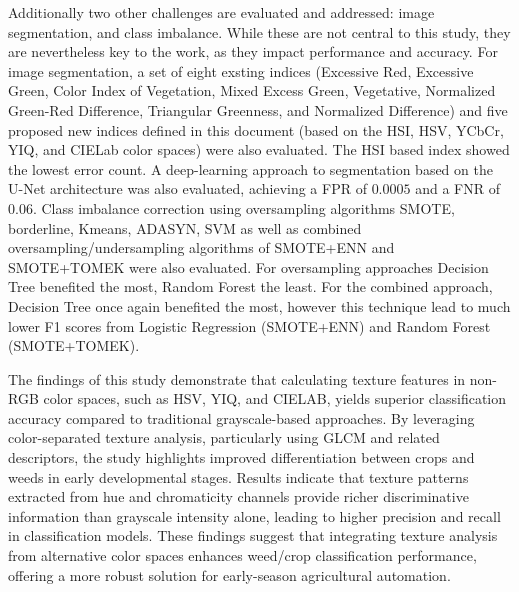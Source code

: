 \documentclass[letterpaper]{report}
\begin{document}
Additionally two other challenges are evaluated and addressed: image segmentation, and class imbalance. While these are not central to  this study, they are nevertheless key to the work, as they impact performance and accuracy.  For image segmentation, a set of eight exsting indices (Excessive Red, Excessive Green, Color Index of Vegetation, Mixed Excess Green, Vegetative, Normalized Green-Red Difference, Triangular Greenness, and Normalized Difference) and five proposed new indices defined in this document (based on the HSI, HSV, YCbCr, YIQ, and CIELab color spaces) were also evaluated. The HSI based index showed the lowest error count. A deep-learning approach to segmentation based on the U-Net architecture was also evaluated, achieving a \gls{FPR} of $0.0005$ and a \gls{FNR} of $0.06$. 
Class imbalance correction using oversampling algorithms \gls{SMOTE}, borderline, Kmeans, \gls{ADASYN}, \gls{SVM} as well as combined oversampling/undersampling algorithms of SMOTE+\gls{ENN} and SMOTE+TOMEK were also evaluated. For oversampling approaches Decision Tree benefited the most, Random Forest the least. For the combined approach, Decision Tree once again benefited the most, however this technique lead to much lower F1 scores from Logistic Regression (SMOTE+ENN) and Random Forest (SMOTE+TOMEK).

The findings of this study demonstrate that calculating texture features in non-RGB color spaces, such as \gls{HSV}, YIQ, and CIELAB, yields superior classification accuracy compared to traditional grayscale-based approaches. By leveraging color-separated texture analysis, particularly using \gls{GLCM} and related descriptors, the study highlights improved differentiation between crops and weeds in early developmental stages. Results indicate that texture patterns extracted from hue and chromaticity channels provide richer discriminative information than grayscale intensity alone, leading to higher precision and recall in classification models. These findings suggest that integrating texture analysis from alternative color spaces enhances weed/crop classification performance, offering a more robust solution for early-season agricultural automation.

\newpage
%
%

\end{document}

